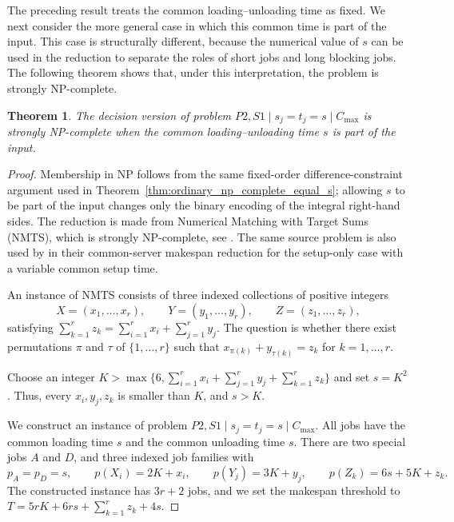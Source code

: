 \documentclass[11pt]{article}
\newtheorem{theorem}{Theorem}
\begin{document}
The preceding result treats the common loading--unloading time as fixed. We next
consider the more general case in which this common time is part of the input. This
case is structurally different, because the numerical value of \(s\) can be used in the
reduction to separate the roles of short jobs and long blocking jobs. The following
theorem shows that, under this interpretation, the problem is strongly NP-complete.
\begin{theorem}
\label{thm:variable_s_strong_np_complete}
The decision version of problem  \(P2,S1\mid s_j=t_j=s\mid C_{\max}\)
is strongly NP-complete when the common loading--unloading time \(s\) is part of the input.
\end{theorem}

\begin{proof}
Membership in NP follows from the same fixed-order difference-constraint argument used
in Theorem~\ref{thm:ordinary_np_complete_equal_s}; allowing \(s\) to be part of the
input changes only the binary encoding of the integral right-hand sides. The reduction is made from
Numerical Matching with Target Sums (NMTS), which is strongly
NP-complete, see \cite{garey_johnson_1979}. The same source problem is also used by
\cite{hall2000} in their common-server makespan reduction for the setup-only
case with a variable common setup time.

An instance of NMTS consists of three indexed collections of positive integers
\[
X=(x_1,\ldots,x_r),\qquad
Y=(y_1,\ldots,y_r),\qquad
Z=(z_1,\ldots,z_r),
\]
satisfying \(\sum_{k=1}^r z_k=\sum_{i=1}^r x_i+\sum_{j=1}^r y_j\). The question is whether there exist permutations \(\pi\) and \(\tau\) of \(\{1,\ldots,r\}\) such that \(x_{\pi(k)}+y_{\tau(k)}=z_k\) for \(k=1,\ldots,r\).

Choose an integer \(K>\max\{6,\sum_{i=1}^r x_i+\sum_{j=1}^r y_j+\sum_{k=1}^r z_k\}\) and set \(s=K^2\).
Thus, every \(x_i,y_j,z_k\) is smaller than \(K\), and \(s>K\).

We construct an instance of problem \(P2,S1\mid s_j=t_j=s\mid C_{\max}\). All jobs have the 
common loading time \(s\) and the common unloading time \(s\). There are two special jobs \(A\) and \(D\), and three indexed job families  with
\[
p_A=p_D=s,\qquad
p(X_i)=2K+x_i,\qquad
p(Y_j)=3K+y_j,\qquad
p(Z_k)=6s+5K+z_k.
\]
The constructed instance has \(3r+2\) jobs, and we set the makespan threshold to \(T=5rK+6rs+\sum_{k=1}^r z_k+4s\).


\end{proof}
\end{document}
